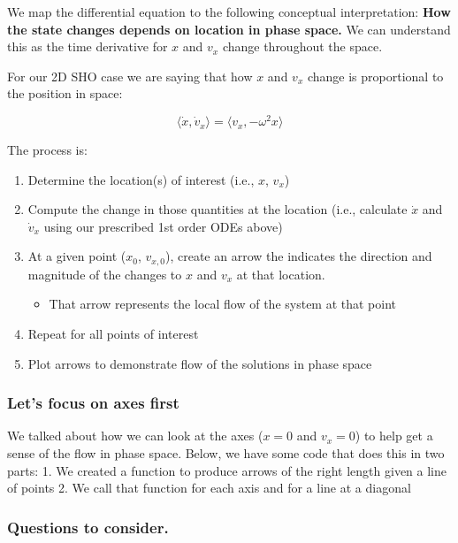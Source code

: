 We map the differential equation to the following conceptual
interpretation: \textbf{How the state changes depends on location in
phase space.} We can understand this as the time derivative for \(x\)
and \(v_x\) change throughout the space.

For our 2D SHO case we are saying that how \(x\) and \(v_x\) change is
proportional to the position in space:

\[\langle \dot{x}, \dot{v}_x \rangle = \langle v_x, -\omega^2 x\rangle\]

The process is:

\begin{enumerate}
\def\labelenumi{\arabic{enumi}.}
\tightlist
\item
  Determine the location(s) of interest (i.e., \(x\), \(v_x\))
\item
  Compute the change in those quantities at the location (i.e.,
  calculate \(\dot{x}\) and \(\dot{v}_x\) using our prescribed 1st order
  ODEs above)
\item
  At a given point (\(x_0\), \(v_{x,0}\)), create an arrow the indicates
  the direction and magnitude of the changes to \(x\) and \(v_x\) at
  that location.

  \begin{itemize}
  \tightlist
  \item
    That arrow represents the local flow of the system at that point
  \end{itemize}
\item
  Repeat for all points of interest
\item
  Plot arrows to demonstrate flow of the solutions in phase space
\end{enumerate}

\subsubsection{Let's focus on axes
first}\label{lets-focus-on-axes-first}

We talked about how we can look at the axes (\(x=0\) and \(v_x =0\)) to
help get a sense of the flow in phase space. Below, we have some code
that does this in two parts: 1. We created a function to produce arrows
of the right length given a line of points 2. We call that function for
each axis and for a line at a diagonal

\subsubsection{Questions to consider.}\label{questions-to-consider.}

